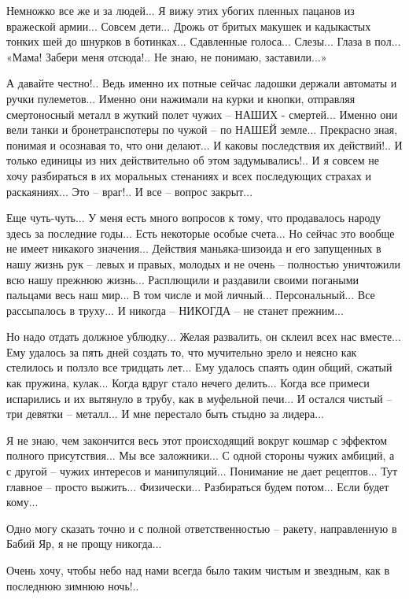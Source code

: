 Немножко все же и за людей... Я вижу этих убогих пленных пацанов из вражеской
армии... Совсем дети... Дрожь от бритых макушек и кадыкастых тонких шей до
шнурков в ботинках... Сдавленные голоса... Слезы... Глаза в пол... «Мама! Забери
меня отсюда!.. Не знаю, не понимаю, заставили...»

А давайте честно!.. Ведь именно их потные сейчас ладошки держали автоматы и
ручки пулеметов... Именно они нажимали на курки и кнопки, отправляя
смертоносный металл в жуткий полет чужих – НАШИХ - смертей... Именно они вели
танки и бронетранспотеры по чужой – по НАШЕЙ земле... Прекрасно зная, понимая
и осознавая то, что они делают... И каковы последствия их действий!.. И только
единицы из них действительно об этом задумывались!.. И я совсем не хочу
разбираться в их моральных стенаниях и всех последующих страхах и
раскаяниях... Это – враг!.. И все – вопрос закрыт...

Еще чуть-чуть... У меня есть много вопросов к тому, что продавалось народу
здесь за последние годы... Есть некоторые особые счета... Но сейчас это вообще
не имеет никакого значения... Действия маньяка-шизоида и его запущенных в нашу
жизнь рук – левых и правых, молодых и не очень – полностью уничтожили всю
нашу прежнюю жизнь... Расплющили и раздавили своими погаными пальцами весь наш
мир... В том числе и мой личный... Персональный... Все рассыпалось в труху... И
никогда – НИКОГДА – не станет прежним... 

Но надо отдать должное ублюдку... Желая развалить, он склеил всех нас вместе...
Ему удалось за пять дней создать то, что мучительно зрело и неясно как
стелилось и ползло все тридцать лет... Ему удалось спаять один общий, сжатый
как пружина, кулак... Когда вдруг стало нечего делить... Когда все примеси
испарились и их вытянуло в трубу, как в муфельной печи... И остался чистый –
три девятки – металл... И мне перестало быть стыдно за лидера... 

Я не знаю, чем закончится весь этот происходящий вокруг кошмар с эффектом
полного присутствия... Мы все заложники... С одной стороны чужих амбиций, а с
другой – чужих интересов и манипуляций... Понимание не дает рецептов... Тут
главное – просто выжить... Физически... Разбираться будем потом... Если будет
кому... 

Одно могу сказать точно и с полной ответственностью – ракету, направленную в
Бабий Яр, я не прощу никогда... 

Очень хочу, чтобы небо над нами всегда было таким чистым и звездным, как в
последнюю зимнюю ночь!..
